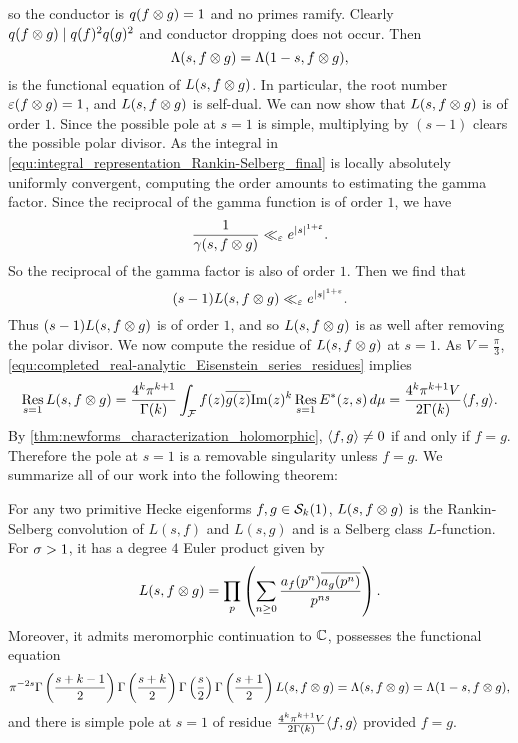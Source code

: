       so the conductor is $q(f \otimes g) = 1$ and no primes ramify. Clearly $q(f \otimes g) \mid q(f)^{2}q(g)^{2}$ and conductor dropping does not occur. Then
      \[
        \Lambda(s,f \otimes g) = \Lambda(1-s,f \otimes g),
      \]
      is the functional equation of $L(s,f \otimes g)$. In particular, the root number $\varepsilon(f \otimes g) = 1$, and $L(s,f \otimes g)$ is self-dual. We can now show that $L(s,f \otimes g)$ is of order $1$. Since the possible pole at $s = 1$ is simple, multiplying by $(s-1)$ clears the possible polar divisor. As the integral in \cref{equ:integral_representation_Rankin-Selberg_final} is locally absolutely uniformly convergent, computing the order amounts to estimating the gamma factor. Since the reciprocal of the gamma function is of order $1$, we have
      \[
        \frac{1}{\gamma(s,f \otimes g)} \ll_{\varepsilon} e^{|s|^{1+\varepsilon}}.
      \]
      So the reciprocal of the gamma factor is also of order $1$. Then we find that
      \[
        (s-1)L(s,f \otimes g) \ll_{\varepsilon} e^{|s|^{1+\varepsilon}}.
      \]
      Thus $(s-1)L(s,f \otimes g)$ is of order $1$, and so $L(s,f \otimes g)$ is as well after removing the polar divisor. We now compute the residue of $L(s,f \otimes g)$ at $s = 1$. As $V = \frac{\pi}{3}$, \cref{equ:completed_real-analytic_Eisenstein_series_residues} implies
      \[
        \operatorname*{\mathrm{Res}}_{s = 1}L(s,f \otimes g) = \frac{4^{k}\pi^{k+1}}{\Gamma(k)}\int_{\mathcal{F}}f(z)\overline{g(z)}\mathrm{Im}(z)^{k}\operatorname*{\mathrm{Res}}_{s = 1}E^{\ast}(z,s)\,d\mu = \frac{4^{k}\pi^{k+1}V}{2\Gamma(k)}\langle f,g\rangle.
      \]
      By \cref{thm:newforms_characterization_holomorphic}, $\langle f,g\rangle \neq 0$ if and only if $f = g$. Therefore the pole at $s = 1$ is a removable singularity unless $f = g$. We summarize all of our work into the following theorem:

      \begin{theorem}
        For any two primitive Hecke eigenforms $f,g \in \mathcal{S}_{k}(1)$, $L(s,f \otimes g)$ is the Rankin-Selberg convolution of $L(s,f)$ and $L(s,g)$ and is a Selberg class $L$-function. For $\sigma > 1$, it has a degree $4$ Euler product given by
        \[
          L(s,f \otimes g) = \prod_{p}\left(\sum_{n \ge 0}\frac{a_{f}(p^{n})\overline{a_{g}(p^{n})}}{p^{ns}}\right).
        \]
        Moreover, it admits meromorphic continuation to $\mathbb{C}$, possesses the functional equation
        \[
          \pi^{-2s}\Gamma\left(\frac{s+k-1}{2}\right)\Gamma\left(\frac{s+k}{2}\right)\Gamma\left(\frac{s}{2}\right)\Gamma\left(\frac{s+1}{2}\right)L(s,f \otimes g) = \Lambda(s,f \otimes g) = \Lambda(1-s,f \otimes g),
        \]
        and there is simple pole at $s = 1$ of residue $\frac{4^{k}\pi^{k+1}V}{2\Gamma(k)}\langle f,g\rangle$ provided $f = g$.
      \end{theorem}
